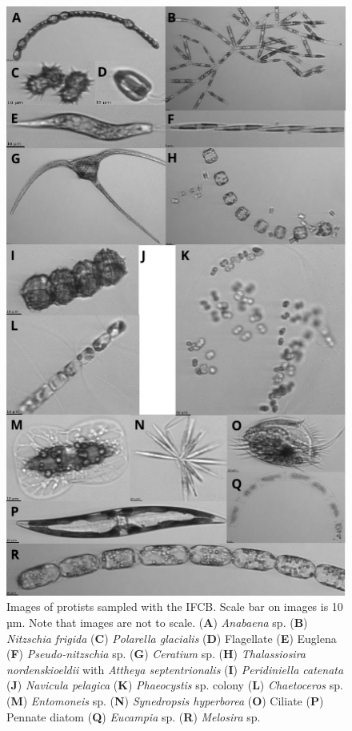 \documentclass[12pt,a4paper]{scrartcl}
\begin{document}
\begin{figure}[h]
	\centering
	\includegraphics[scale = 1]{../../../graphs/fig12.pdf}
	\caption{Images of protists sampled with the IFCB. Scale bar on images is 10 µm. Note that images are not to scale. (\textbf{A}) \textit{Anabaena} sp. (\textbf{B}) \textit{Nitzschia frigida} (\textbf{C}) \textit{Polarella glacialis} (\textbf{D}) Flagellate (\textbf{E}) Euglena (\textbf{F}) \textit{Pseudo-nitzschia} sp. (\textbf{G}) \textit{Ceratium} sp. (\textbf{H}) \textit{Thalassiosira nordenskioeldii} with \textit{Attheya septentrionalis} (\textbf{I}) \textit{Peridiniella catenata} (\textbf{J}) \textit{Navicula pelagica} (\textbf{K}) \textit{Phaeocystis} sp. colony (\textbf{L}) \textit{Chaetoceros} sp. (\textbf{M}) \textit{Entomoneis} sp. (\textbf{N}) \textit{Synedropsis hyperborea} (\textbf{O}) Ciliate (\textbf{P}) Pennate diatom (\textbf{Q}) \textit{Eucampia} sp. (\textbf{R}) \textit{Melosira} sp.}
\end{figure}
\end{document}
